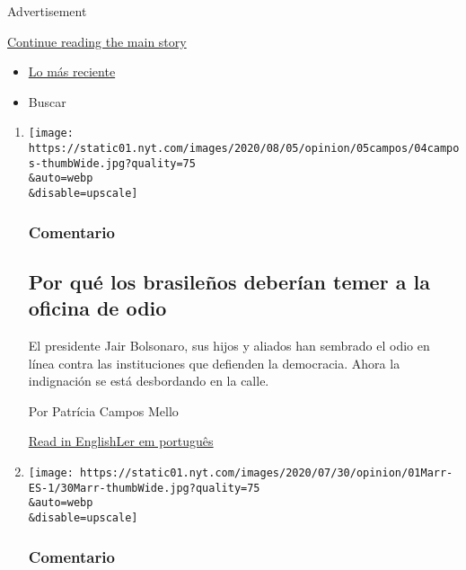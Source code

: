Advertisement

\protect\hyperlink{after-mid1}{Continue reading the main story}

\begin{itemize}
\tightlist
\item
  \protect\hyperlink{stream-panel}{Lo más reciente}
\item
  Buscar
\end{itemize}

\begin{enumerate}
\def\labelenumi{\arabic{enumi}.}
\item
  \href{/es/2020/08/04/espanol/opinion/bolsonaro-oficina-odio-brasil.html}{}

  \texttt{[image: https://static01.nyt.com/images/2020/08/05/opinion/05campos/04campos-thumbWide.jpg?quality=75\\\&auto=webp\\\&disable=upscale]}

  \hypertarget{comentario-4}{%
  \subsubsection{Comentario}\label{comentario-4}}

  \hypertarget{por-quuxe9-los-brasileuxf1os-deberuxedan-temer-a-la-oficina-de-odio}{%
  \subsection{Por qué los brasileños deberían temer a la oficina de
  odio}\label{por-quuxe9-los-brasileuxf1os-deberuxedan-temer-a-la-oficina-de-odio}}

  El presidente Jair Bolsonaro, sus hijos y aliados han sembrado el odio
  en línea contra las instituciones que defienden la democracia. Ahora
  la indignación se está desbordando en la calle.

  Por Patrícia Campos Mello

  \href{https://www.nytimes.com/2020/08/04/opinion/bolsonaro-office-of-hate-brazil.html}{Read
  in
  English}\href{https://www.nytimes.com/pt/2020/08/04/opinion/international-world/bolsonaro-gabinete-do-odio.html}{Ler
  em português}
\item
  \href{/es/2020/08/01/espanol/opinion/coronavirus-aire.html}{}

  \texttt{[image: https://static01.nyt.com/images/2020/07/30/opinion/01Marr-ES-1/30Marr-thumbWide.jpg?quality=75\\\&auto=webp\\\&disable=upscale]}

  \hypertarget{comentario-5}{%
  \subsubsection{Comentario}\label{comentario-5}}


\end{enumerate}
